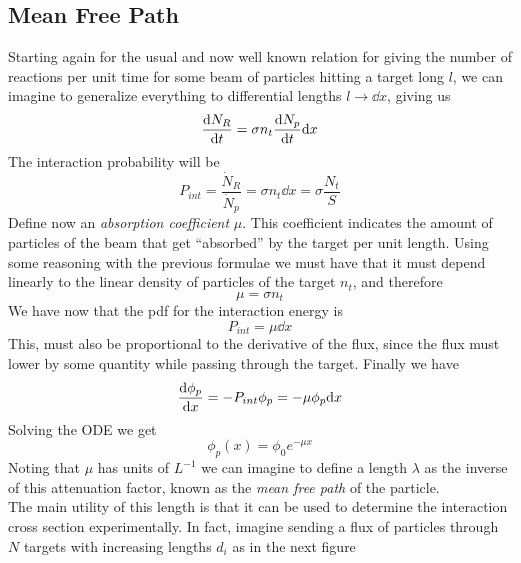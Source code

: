 \documentclass[../qm.tex]{subfiles}
\begin{document}
\subsection{Mean Free Path}
Starting again for the usual and now well known relation for giving the number of reactions per unit time for some beam of particles hitting a target long $l$, we can imagine to generalize everything to differential lengths $l\to\dd x$, giving us
\begin{equation*}
	\dv{N_R}{t}=\sigma n_t\dv{N_p}{t}\dd x
\end{equation*}
The interaction probability will be
\begin{equation*}
	P_{int}=\frac{\dot{N}_R}{\dot{N}_p}=\sigma n_t\dd x= \sigma\frac{N_t}{S}
\end{equation*}
Define now an \emph{absorption coefficient} $\mu$. This coefficient indicates the amount of particles of the beam that get ``absorbed'' by the target per unit length. Using some reasoning with the previous formulae we must have that it must depend linearly to the linear density of particles of the target $n_t$, and therefore
\begin{equation}
	\mu=\sigma n_t
	\label{eq:absorptioncoeff}
\end{equation}
We have now that the pdf for the interaction energy is
\begin{equation}
	P_{int}=\mu\dd x
	\label{eq:interactionprob}
\end{equation}
This, must also be proportional to the derivative of the flux, since the flux must lower by some quantity while passing through the target. Finally we have
\begin{equation}
	\dv{\phi_p}{x}=-P_{int}\phi_p=-\mu\phi_p\dd x
	\label{eq:fluxdecrease}
\end{equation}
Solving the ODE we get
\begin{equation}
	\phi_p(x)=\phi_0e^{-\mu x}
	\label{eq:fluxred}
\end{equation}
Noting that $\mu$ has units of $L^{-1}$ we can imagine to define a length $\lambda$ as the inverse of this attenuation factor, known as the \emph{mean free path} of the particle.\\
The main utility of this length is that it can be used to determine the interaction cross section experimentally. In fact, imagine sending a flux of particles through $N$ targets with increasing lengths $d_i$ as in the next figure
\end{document}
